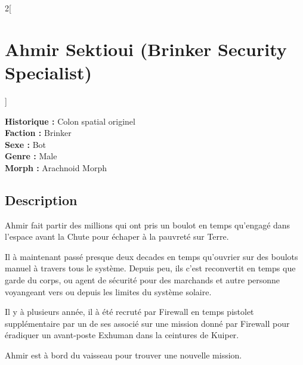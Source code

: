 \documentclass[a4paper,9pt]{article}
\begin{document}
\newpage

\begin{multicols}{2}[\section*{Ahmir Sektioui (Brinker Security Specialist)}]

   \noindent\textbf{Historique :} Colon spatial originel\\
   \noindent\textbf{Faction :} Brinker\\
   \noindent\textbf{Sexe :} Bot\\
   \noindent\textbf{Genre :} Male\\
   \noindent\textbf{Morph :} Arachnoid Morph\\

   \subsection*{Description}

   Ahmir fait partir des millions qui ont pris un boulot en temps qu'engagé dans
   l'espace avant la Chute pour échaper à la pauvreté sur Terre.

   Il à maintenant passé presque deux decades en temps qu'ouvrier sur des boulots
   manuel à travers tous le système.
   Depuis peu, ils c'est reconvertit en temps que garde du corps, ou agent de
   sécurité pour des marchands et autre personne voyangeant vers ou depuis
   les limites du système solaire.

   Il y à plusieurs année, il à été recruté par Firewall en temps pistolet
   supplémentaire par un de ses associé sur une mission donné par Firewall
   pour éradiquer un avant-poste Exhuman dans la ceintures de Kuiper.

   Ahmir est à bord du vaisseau pour trouver une nouvelle mission.


\end{multicols}
\end{document}
